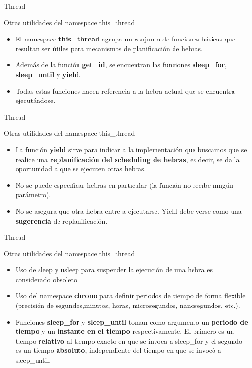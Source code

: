 \begin{frame}{Thread}
\begin{block}{Otras utilidades del namespace this\_thread}
\begin{itemize}
  \item El namespace \textbf{this\_thread} agrupa un conjunto de funciones básicas que resultan ser útiles para mecanismos de planificación de hebras.
  \item Además de la función \textbf{get\_id}, se encuentran las funciones \textbf{sleep\_for}, \textbf{sleep\_until} y \textbf{yield}.
  \item Todas estas funciones hacen referencia a la hebra actual que se encuentra ejecutándose.
\end{itemize}
\end{block}
\end{frame}

\begin{frame}{Thread}
\begin{block}{Otras utilidades del namespace this\_thread}
\begin{itemize}
  \item La función \textbf{yield} sirve para indicar a la implementación que buscamos que se realice una \textbf{replanificación del scheduling de hebras}, es decir, se da la oportunidad a que se ejecuten otras hebras.
  \item No se puede especificar hebras en particular (la función no recibe ningún parámetro).
  \item No se asegura que otra hebra entre a ejecutarse. Yield debe verse como una \textbf{sugerencia} de replanificación.
\end{itemize}
\end{block}
\end{frame}

\begin{frame}{Thread}
\begin{block}{Otras utilidades del namespace this\_thread}
\begin{itemize}
  \item Uso de sleep y usleep para suspender la ejecución de una hebra es considerado obsoleto.
  \item Uso del namespace \textbf{chrono} para definir periodos de tiempo de forma flexible (precisión de segundos,minutos, horas, microsegundos, nanosegundos, etc.).
  \item Funciones \textbf{sleep\_for} y \textbf{sleep\_until} toman como argumento un \textbf{periodo de tiempo} y un \textbf{instante en el tiempo} respectivamente. El primero es un tiempo \textbf{relativo} al tiempo exacto en que se invoca a sleep\_for y el segundo es un tiempo \textbf{absoluto}, independiente del tiempo en que se invocó a sleep\_until.
\end{itemize}
\end{block}
\end{frame}

